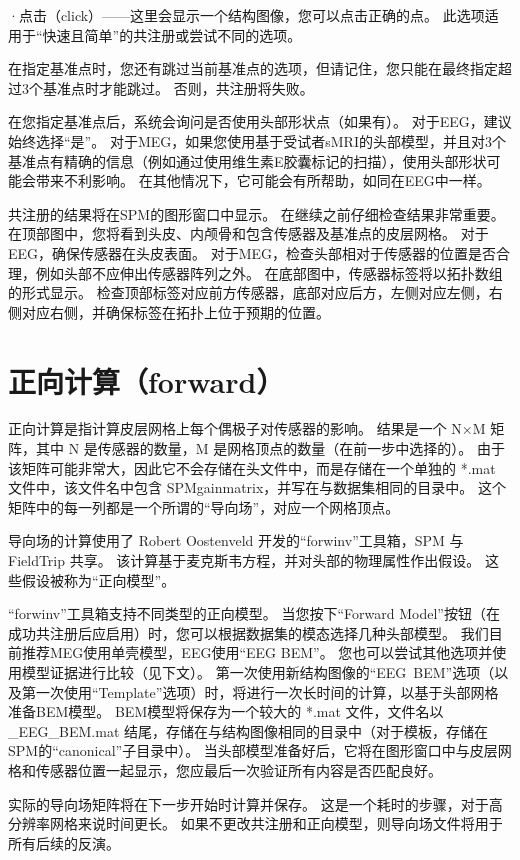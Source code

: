 ·点击（click）——这里会显示一个结构图像，您可以点击正确的点。
此选项适用于“快速且简单”的共注册或尝试不同的选项。

在指定基准点时，您还有跳过当前基准点的选项，但请记住，您只能在最终指定超过3个基准点时才能跳过。
否则，共注册将失败。

在您指定基准点后，系统会询问是否使用头部形状点（如果有）。
对于EEG，建议始终选择“是”。
对于MEG，如果您使用基于受试者sMRI的头部模型，并且对3个基准点有精确的信息（例如通过使用维生素E胶囊标记的扫描），使用头部形状可能会带来不利影响。
在其他情况下，它可能会有所帮助，如同在EEG中一样。

共注册的结果将在SPM的图形窗口中显示。
在继续之前仔细检查结果非常重要。
在顶部图中，您将看到头皮、内颅骨和包含传感器及基准点的皮层网格。
对于EEG，确保传感器在头皮表面。
对于MEG，检查头部相对于传感器的位置是否合理，例如头部不应伸出传感器阵列之外。
在底部图中，传感器标签将以拓扑数组的形式显示。
检查顶部标签对应前方传感器，底部对应后方，左侧对应左侧，右侧对应右侧，并确保标签在拓扑上位于预期的位置。


\section{正向计算（forward）}

正向计算是指计算皮层网格上每个偶极子对传感器的影响。
结果是一个 N×M 矩阵，其中 N 是传感器的数量，M 是网格顶点的数量（在前一步中选择的）。
由于该矩阵可能非常大，因此它不会存储在头文件中，而是存储在一个单独的 *.mat 文件中，该文件名中包含 SPMgainmatrix，并写在与数据集相同的目录中。
这个矩阵中的每一列都是一个所谓的“导向场”，对应一个网格顶点。

导向场的计算使用了 Robert Oostenveld 开发的“forwinv”工具箱，SPM 与 FieldTrip 共享。
该计算基于麦克斯韦方程，并对头部的物理属性作出假设。
这些假设被称为“正向模型”。

“forwinv”工具箱支持不同类型的正向模型。
当您按下“Forward Model”按钮（在成功共注册后应启用）时，您可以根据数据集的模态选择几种头部模型。
我们目前推荐MEG使用单壳模型，EEG使用“EEG BEM”。
您也可以尝试其他选项并使用模型证据进行比较（见下文）。
第一次使用新结构图像的“EEG\ BEM”选项（以及第一次使用“Template”选项）时，将进行一次长时间的计算，以基于头部网格准备BEM模型。
BEM模型将保存为一个较大的 *.mat 文件，文件名以 \_EEG\_BEM.mat 结尾，存储在与结构图像相同的目录中（对于模板，存储在SPM的“canonical”子目录中）。
当头部模型准备好后，它将在图形窗口中与皮层网格和传感器位置一起显示，您应最后一次验证所有内容是否匹配良好。

实际的导向场矩阵将在下一步开始时计算并保存。
这是一个耗时的步骤，对于高分辨率网格来说时间更长。
如果不更改共注册和正向模型，则导向场文件将用于所有后续的反演。


